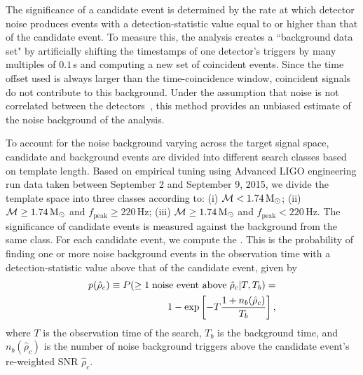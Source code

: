 The significance of a candidate event is determined by the rate at which
detector noise produces events with a detection-statistic value equal to or
higher than that of the candidate event. To measure this, the analysis creates
a ``background data set" by artificially shifting the time\-stamps of one
detector's triggers by many multiples of $0.1$\,s and computing a new set of
coincident events.  Since the time offset used is always larger than the
time-coincidence window, coincident signals do not contribute to this
background. Under the assumption that noise is not correlated between the
detectors~\cite{GW150914-DETCHAR}, this method provides an unbiased estimate
of the noise background of the analysis. 

To account for the noise background varying across the target signal space,
candidate and background events are divided into different search classes
based on template length.  Based on empirical tuning using Advanced LIGO
engineering run data taken between September 2 and September 9, 2015, we
divide the template space into three classes according to: (i) $\mathcal{M} <
1.74\,\mathrm{M}_\odot$; (ii) $\mathcal{M}
\geq 1.74\,\mathrm{M}_\odot$ and $f_\mathrm{peak} \geq 220\,$Hz; (iii) $\mathcal{M} \geq 1.74\,\mathrm{M}_\odot$
and $f_\mathrm{peak} < 220\,$Hz.  The significance of candidate events is
measured against the background from the same class.  For each candidate
event, we compute the \fap{}. This is the probability
of finding one or more noise background events in the observation time with a
detection-statistic value above that of the candidate event, given
by~\cite{Usman:2015kfa, Capano:2016uif}
\begin{equation} 
\begin{split}
\label{eq:pycbc_slide_fap}
 p(\hat{\rho}_c) \equiv P(\geq 1\;\text{noise event above}\;\hat{\rho}_c|T, T_b) = \\
 1 - \exp\left[ -T \frac{1+n_b(\hat{\rho}_c)}{T_b} \right],
\end{split}
\end{equation}
where $T$ is the observation time of the search, $T_b$ is the background time,
and $n_b(\hat{\rho}_c)$ is the number of noise background triggers above the
candidate event's re-weighted SNR $\hat{\rho}_c$. 

